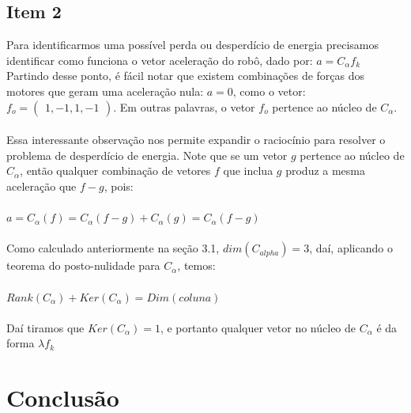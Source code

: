\documentclass{article}
\begin{document}
\subsection{Item 2}
Para identificarmos uma possível perda ou desperdício de energia precisamos identificar como funciona o vetor aceleração do robô, dado por: 
$ a = C_{\alpha}f_{k}$ Partindo desse ponto, é fácil notar que existem combinações de forças dos motores que geram uma aceleração nula:
$ a = 0 $, como o vetor: $f_{o} = \begin{pmatrix} 1,-1,1,-1\end{pmatrix}$. Em outras palavras, o vetor $f_{o}$ pertence ao núcleo de $C_{\alpha}$.
\\ \\
Essa interessante observação nos permite expandir o raciocínio para resolver o problema de desperdício de energia. Note que se um vetor $g$ pertence ao núcleo de $C_{\alpha}$, então qualquer combinação de vetores $f$ que inclua $g$
produz a mesma aceleração que $f - g$, pois:\\
\\  $ a = C_{\alpha}(f) = C_{\alpha}(f-g) + C_{\alpha}(g) = C_{\alpha}(f-g)$
\\ \\
Como calculado anteriormente na seção 3.1, $dim(C_{alpha}) = 3$, daí, aplicando o teorema do posto-nulidade para $C_{\alpha}$, temos:
\\  \\ $ Rank(C_{\alpha}) + Ker(C_{\alpha}) = Dim(coluna)$ \\ \\
Daí tiramos que $Ker(C_{\alpha}) = 1 $, e portanto qualquer vetor no núcleo de $C_{\alpha}$ é da forma $\lambda f_{k}$

\section{Conclusão}
\end{document}
